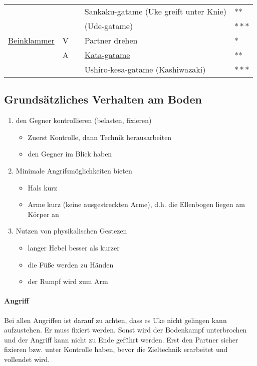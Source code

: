 \documentclass[justified, a4paper, notitlepage, captions=tableheading, nobib]{tufte-handout}
\begin{document}
\begin{center}
\begin{tabular}{lllll}
 &  &  & Sankaku-gatame (Uke greift unter Knie) & **\\
 &  &  & (Ude-gatame) & \(\ast \ast \ast\)\\
\hline
\hyperref[org2aa82f8]{Beinklammer} & V &  & Partner drehen & *\\
 & A &  & \hyperref[org52b0dc1]{Kata-gatame} & **\\
 &  &  & Ushiro-kesa-gatame (Kashiwazaki) & \(\ast \ast \ast\)\\
\end{tabular}
\end{center}

\newpage
\subsection{Grundsätzliches Verhalten am Boden}
\label{sec:org60b4cc0}
\begin{enumerate}
\item den Gegner kontrollieren (belasten, fixieren) 
\begin{itemize}
\item Zuerst Kontrolle, dann Technik herausarbeiten
\item den Gegner im Blick haben
\end{itemize}
\item Minimale Angrifsmöglichkeiten bieten
\begin{itemize}
\item Hals kurz
\item Arme kurz (keine ausgestreckten Arme), d.h. die Ellenbogen liegen am Körper an
\end{itemize}
\item Nutzen von physikalischen Gestezen
\begin{itemize}
\item langer Hebel besser als kurzer
\item die Füße werden zu Händen
\item der Rumpf wird zum Arm
\end{itemize}
\end{enumerate}

\paragraph{Angriff}
\label{sec:org974ff43}
Bei allen Angriffen ist darauf zu achten, dass es Uke nicht gelingen kann aufzustehen. 
Er muss fixiert werden. Sonst wird der Bodenkampf unterbrochen und der Angriff kann nicht zu Ende geführt werden.
Erst den Partner sicher fixieren bzw. unter Kontrolle haben, bevor die Zieltechnik erarbeitet und vollendet wird.
\end{document}

